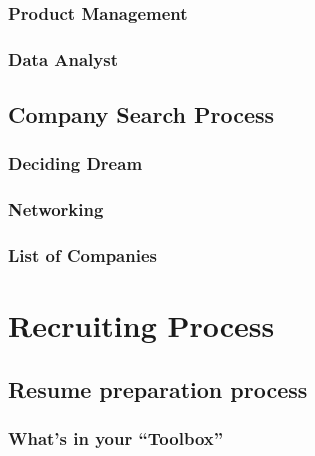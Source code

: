 \documentclass[
]{book}
\begin{document}
\hypertarget{product-management}{%
\subsection{Product Management}\label{product-management}}

\hypertarget{data-analyst}{%
\subsection{Data Analyst}\label{data-analyst}}

\hypertarget{company-search-process}{%
\section{Company Search Process}\label{company-search-process}}

\hypertarget{deciding-dream}{%
\subsection{Deciding Dream}\label{deciding-dream}}

\hypertarget{networking}{%
\subsection{Networking}\label{networking}}

\hypertarget{list-of-companies}{%
\subsection{List of Companies}\label{list-of-companies}}

\hypertarget{recruiting-process}{%
\chapter{Recruiting Process}\label{recruiting-process}}

\hypertarget{resume-preparation-process}{%
\section{Resume preparation process}\label{resume-preparation-process}}

\hypertarget{whats-in-your-toolbox}{%
\subsection{What's in your ``Toolbox''}\label{whats-in-your-toolbox}}
\end{document}
